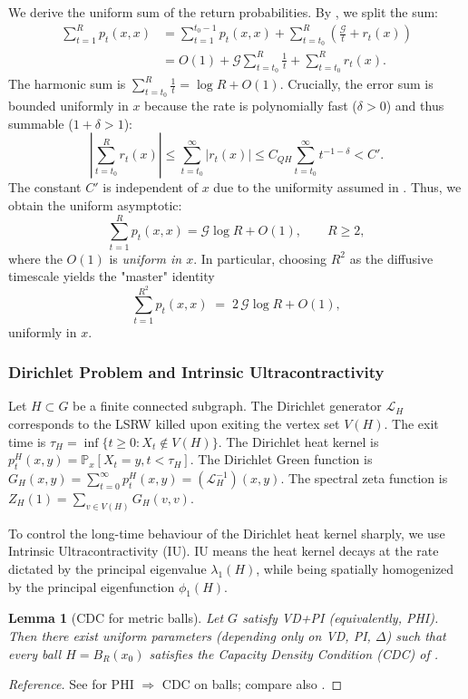 \documentclass{article}
\numberwithin{equation}{section}
\newtheorem{lemma}[theorem]{Lemma}
\theoremstyle{definition}
\theoremstyle{remark}
\newcommand{\cG}{\mathcal{G}}
\newcommand{\LL}{\mathcal{L}}
\newcommand{\Prob}{\mathbb{P}}
\begin{document}
We derive the uniform sum of the return probabilities. By , we split the sum:
\begin{align*}
\sum_{t=1}^{R} p_t(x,x) &= \sum_{t=1}^{t_0-1} p_t(x,x) + \sum_{t=t_0}^{R} \left(\frac{\cG}{t} + r_t(x)\right) \\
&= O(1) + \cG \sum_{t=t_0}^{R} \frac{1}{t} + \sum_{t=t_0}^{R} r_t(x).
\end{align*}
The harmonic sum is $\sum_{t=t_0}^{R} \frac{1}{t} = \log R + O(1)$.
Crucially, the error sum is bounded uniformly in $x$ because the rate is polynomially fast ($\delta>0$) and thus summable ($1+\delta > 1$):
\[
\left|\sum_{t=t_0}^{R} r_t(x)\right| \leq \sum_{t=t_0}^{\infty} |r_t(x)| \leq C_{QH} \sum_{t=t_0}^{\infty} t^{-1-\delta} < C'.
\]
The constant $C'$ is independent of $x$ due to the uniformity assumed in .
Thus, we obtain the uniform asymptotic:
\begin{equation}\label{eq:return-sum}
\sum_{t=1}^{R} p_t(x,x) = \cG \log R + O(1), \qquad R \geq 2,
\end{equation}
where the $O(1)$ is \emph{uniform in $x$}. In particular, choosing $R^2$ as the diffusive timescale yields the "master" identity
\begin{equation}\label{eq:master-sum}
  \sum_{t=1}^{R^{2}} p_t(x,x)
  \;=\; 2\,\cG \log R + O(1),
\end{equation}
uniformly in $x$.



\subsubsection{Dirichlet Problem and Intrinsic Ultracontractivity}
Let $H \subset G$ be a finite connected subgraph.
The Dirichlet generator $\LL_H$ corresponds to the LSRW killed upon exiting the vertex set $V(H)$. The exit time is $\tau_H = \inf\{t \geq 0 : X_t \notin V(H)\}$.
The Dirichlet heat kernel is $p_t^H(x,y) = \Prob_x[X_t = y, t < \tau_H]$. The Dirichlet Green function is $G_H(x,y) = \sum_{t=0}^{\infty} p_t^H(x,y) = (\LL_H^{-1})(x,y)$. The spectral zeta function is $Z_H(1) = \sum_{v \in V(H)} G_H(v,v)$.

To control the long-time behaviour of the Dirichlet heat kernel sharply, we use Intrinsic Ultracontractivity (IU). IU means the heat kernel decays at the rate dictated by the principal eigenvalue $\lambda_1(H)$, while being spatially homogenized by the principal eigenfunction $\phi_1(H)$.

\begin{lemma}[CDC for metric balls]\label{lem:CDC-balls}
Let $G$ satisfy VD+PI (equivalently, PHI). Then there exist uniform parameters (depending only on VD, PI, $\Delta$) such that every ball $H=B_R(x_0)$ satisfies the Capacity Density Condition \textup{(CDC)} of .
\end{lemma}
\begin{proof}[Reference]
See \cite[Prop.~3.5]{BarlowBass04} for PHI $\Rightarrow$ CDC on balls; compare also \cite{BarlowBassKumagai09}.
\end{proof}
\end{document}
